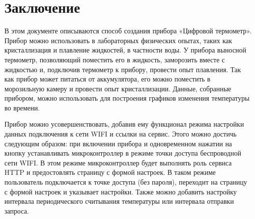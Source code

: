 \documentclass[12pt]{extarticle}
\begin{document}
\section{Заключение}\label{Заключение}

В этом документе описываются способ создания прибора «Цифровой термометр». Прибор можно использовать в лабораторных физических опытах, таких как кристаллизация и плавление жидкостей, в частности воды. У прибора выносной термометр, позволяющий поместить его в жидкость, заморозить вместе с жидкостью и, подключив термометр к прибору, провести опыт плавления. Так как прибор может питаться от аккумулятора, его можно поместить в морозильную камеру и провести опыт кристаллизации. Данные, собранные прибором, можно использовать для построения графиков изменения температуры во времени.

Прибор можно усовершенствовать, добавив ему функционал режима настройки данных подключения к сети WIFI и ссылки на сервис. Этого можно достичь следующим образом: при включении прибора и одновременном нажатии на кнопку устанавливать микроконтроллер в режиме точки доступа беспроводной сети WIFI. В этом режиме микроконтроллер будет выполнять роль сервиса HTTP и предостовлять страницу с формой настроек. В таком режиме пользователь подключается к точке доступа (без пароля), переходит на страницу с формой настроек и указывает настройки. Также можно добавить настройку интервала периодического считывания температуры или интервала отправки запроса.
\end{document}
